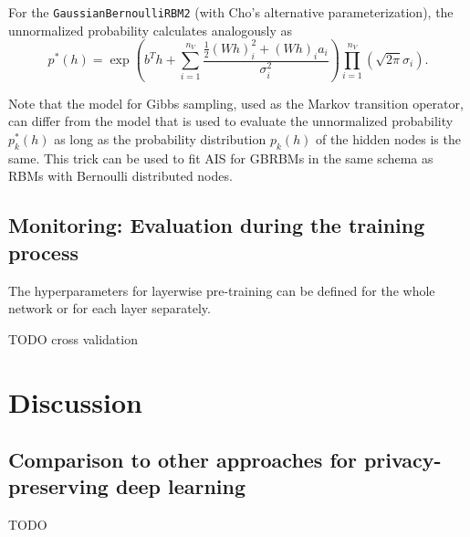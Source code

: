 \documentclass[12pt]{article}
\newcommand{\inlinecode}[1]{\texttt{#1}}
\begin{document}
For the \inlinecode{GaussianBernoulliRBM2} (with Cho's alternative parameterization), the unnormalized probability calculates analogously as
\[
   p^*(h) = \exp \left( b^T h + \sum_{i=1}^{n_V} \frac{\frac{1}{2}(Wh)_i^2 + (Wh)_i a_i}{\sigma_i^2} \right ) \prod_{i=1}^{n_V}\left(\sqrt{2\pi} \sigma_i\right).
\]

Note that the model for Gibbs sampling, used as the Markov transition operator, can differ from the model that is used to evaluate the unnormalized probability $p_k^*(h)$ as long as the probability distribution $p_k(h)$ of the hidden nodes is the same.
This trick can be used to fit AIS for GBRBMs in the same schema as RBMs with Bernoulli distributed nodes.


\subsection{Monitoring: Evaluation during the training process}


The hyperparameters for layerwise pre-training can be defined for the whole network or for each layer separately. %

TODO cross validation

\section{Discussion}

\subsection{Comparison to other approaches for privacy-preserving deep learning}
TODO
\end{document}
